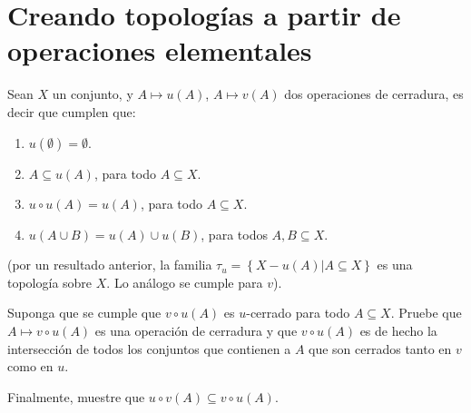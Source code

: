 \documentclass[12pt]{report}
\theoremstyle{largebreak}
\begin{document}
    \newpage

    \section{Creando topologías a partir de operaciones elementales}

    \begin{excer}
        Sean $X$ un conjunto, y $A\mapsto u(A)$, $A\mapsto v(A)$ dos operaciones de cerradura, es decir que cumplen que:
        \begin{enumerate}
            \item $u(\emptyset)=\emptyset$.
            \item $A\subseteq u(A)$, para todo $A\subseteq X$.
            \item $u\circ u(A)=u(A)$, para todo $A\subseteq X$.
            \item $u(A\cup B)=u(A)\cup u(B)$, para todos $A,B\subseteq X$.
        \end{enumerate}
        (por un resultado anterior, la familia $\tau_u=\left\{X-u(A)\Big|A\subseteq X \right\}$ es una topología sobre $X$. Lo análogo se cumple para $v$).

        Suponga que se cumple que $v\circ u(A)$ es $u$-cerrado para todo $A\subseteq X$. Pruebe que $A\mapsto v\circ u(A)$ es una operación de cerradura y que $v\circ u(A)$ es de hecho la intersección de todos los conjuntos que contienen a $A$ que son cerrados tanto en $v$ como en $u$.

        Finalmente, muestre que $u\circ v(A)\subseteq v\circ u(A)$.
    \end{excer}
\end{document}
